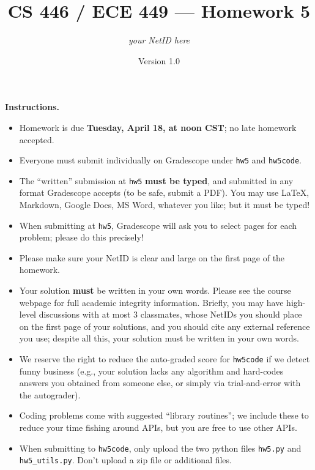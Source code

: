 \documentclass{article}
\title{CS 446 / ECE 449 --- Homework 5}
\author{\emph{your NetID here}}
\date{Version 1.0}
\theoremstyle{definition}
\theoremstyle{remark}
\begin{document}
\maketitle

\noindent\textbf{Instructions.}
\begin{itemize}
  \item
    Homework is due \textbf{Tuesday, April 18, at noon CST}; no late homework accepted.

  \item
    Everyone must submit individually on Gradescope under \texttt{hw5} and \texttt{hw5code}.

  \item
    The ``written'' submission at \texttt{hw5} \textbf{must be typed}, and submitted in
    any format Gradescope accepts (to be safe, submit a PDF).  You may use \LaTeX, Markdown,
    Google Docs, MS Word, whatever you like; but it must be typed!

  \item
    When submitting at \texttt{hw5}, Gradescope will ask you to select pages
    for each problem; please do this precisely!

  \item
    Please make sure your NetID is clear and large on the first page of the homework.

  \item
    Your solution \textbf{must} be written in your own words.
    Please see the course webpage for full academic integrity information.
    Briefly, you may have high-level discussions with at most 3 classmates,
    whose NetIDs you should place on the first page of your solutions,
    and you should cite any external reference you use; despite all this,
    your solution must be written in your own words.

    \item
      We reserve the right to reduce the auto-graded score for
      \texttt{hw5code} if we detect funny business (e.g., your solution
      lacks any algorithm and hard-codes answers you obtained from
      someone else, or simply via trial-and-error with the autograder).

    \item
      Coding problems come with suggested ``library routines''; we include these to reduce
      your time fishing around APIs, but you are free to use other APIs.

    \item
      When submitting to \texttt{hw5code}, only upload the two python files \texttt{hw5.py} and \texttt{hw5\_utils.py}. Don't upload a zip file or additional files.
    
\end{itemize}
\end{document}
